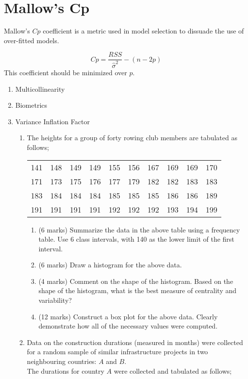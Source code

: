 \section{Mallow's Cp}
Mallow's $Cp$ coefficient is a metric used in model selection to
dissuade the use of over-fitted models.

\begin{equation}
Cp= \frac{RSS}{\hat{\sigma}^{2}}-(n-2p)
\end{equation}
This coefficient should be minimized over $p$.

\begin{enumerate}
	\item Multicollinearity
	\item Biometrics
	\item Variance Inflation Factor
	\begin{enumerate}
		\item The heights for a group of forty rowing club members are tabulated as follows;
		
		\begin{table}[ht]
			\begin{center}
				\begin{tabular}{|rrrrrrrrrr|}
					
					\hline
					141 & 148 & 149 & 149 & 155 & 156 & 167 & 169 & 169 & 170 \\
					171 & 173 & 175 & 176 & 177 & 179 & 182 & 182 & 183 & 183 \\
					183 & 184 & 184 & 184 & 185 & 185 & 185 & 186 & 186 & 189 \\
					191 & 191 & 191 & 191 & 192 & 192 & 192 & 193 & 194 & 199 \\
					\hline
				\end{tabular}
			\end{center}
		\end{table}
		\vspace{-0.5cm}
		\begin{enumerate}
			\item (6 marks) Summarize the data in the above table using a frequency table. Use 6 class intervals, with 140 as the lower limit of the first interval.
			\item (6 marks) Draw a histogram for the above data.
			\item (4 marks) Comment on the shape of the histogram. Based on the shape of the histogram, what is the best measure of centrality and variability?
			\item (12 marks) Construct a box plot for the above data. Clearly demonstrate how all of the necessary values were computed.
		\end{enumerate}
		\vspace{0.25cm}
		\item Data on the construction durations (measured in months) were collected for a random sample of similar infrastructure projects in two neighbouring countries: $A$ and $B$.\\
		The durations for country $A$ were collected and tabulated as follows;
		

\end{enumerate}
\end{enumerate}
